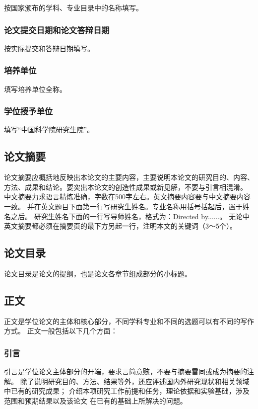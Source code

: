 按国家颁布的学科、专业目录中的名称填写。

\subsubsection{论文提交日期和论文答辩日期}

按实际提交和答辩日期填写。

\subsubsection{培养单位}

填写培养单位全称。

\subsubsection{学位授予单位}

填写``中国科学院研究生院''。

\subsection{论文摘要}

论文摘要应概括地反映出本论文的主要内容，主要说明本论文的研究目的、内容、
方法、成果和结论。要突出本论文的创造性成果或新见解，不要与引言相混淆。
中文摘要力求语言精炼准确，字数在500字左右。英文摘要内容要与中文摘要内容一致。
并在英文题目下面第一行写研究生姓名。专业名称用括号括起后，置于姓名之后。
研究生姓名下面的一行写导师姓名，格式为：Directed by......。
无论中英文摘要都必须在摘要页的最下方另起一行，注明本文的关键词（3～5个）。

\subsection{论文目录}

论文目录是论文的提纲，也是论文各章节组成部分的小标题。

\subsection{正文}

正文是学位论文的主体和核心部分，不同学科专业和不同的选题可以有不同的写作方式。
正文一般包括以下几个方面：

\subsubsection{引言}

引言是学位论文主体部分的开端，要求言简意赅，不要与摘要雷同或成为摘要的注解。
除了说明研究目的、方法、结果等外，还应评述国内外研究现状和相关领域中已有的研究成果；
介绍本项研究工作前提和任务，理论依据和实验基础，涉及范围和预期结果以及该论文
在已有的基础上所解决的问题。

